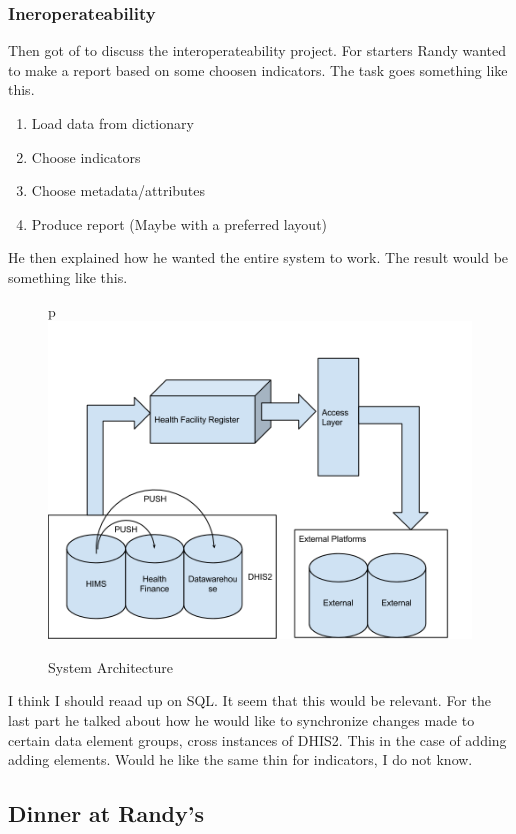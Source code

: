 \subsubsection{Ineroperateability}
Then got of to discuss the interoperateability project.
For starters Randy wanted to make a report based on some choosen indicators.
The task goes something like this.
\begin{enumerate}
\item Load data from dictionary
\item Choose indicators
\item Choose metadata/attributes
\item Produce report (Maybe with a preferred layout)
\end{enumerate}
He then explained how he wanted the entire system to work.
The result would be something like this.
\begin{figure}{p}
\centering
\includegraphics[width=15cm]{appendix/images/System_Architecture}
\caption{System Architecture}
\label{System Architecture}
\end{figure}
I think I should reaad up on SQL. It seem that this would be relevant.
For the last part he talked about how he would like to synchronize changes made to certain data element groups, cross instances of DHIS2. This in the case of adding adding elements. Would he like the same thin for indicators, I do not know. 
\subsection{Dinner at Randy's}


